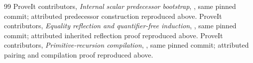 \begin{thebibliography}{99}
 ProveIt contributors,
\emph{Internal scalar predecessor bootstrap},
,
same pinned commit; attributed predecessor construction reproduced above.
 ProveIt contributors,
\emph{Equality reflection and quantifier-free induction},
,
same pinned commit; attributed inherited reflection proof reproduced above.
 ProveIt contributors,
\emph{Primitive-recursion compilation},
,
same pinned commit; attributed pairing and compilation proof reproduced above.
\end{thebibliography}

